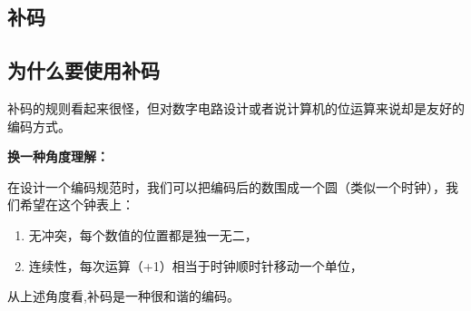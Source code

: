 \subsection{补码}





\subsection{为什么要使用补码}

补码的规则看起来很怪，但对数字电路设计或者说计算机的位运算来说却是友好的编码方式。

\textbf{换一种角度理解：}

在设计一个编码规范时，我们可以把编码后的数围成一个圆（类似一个时钟），我们希望在这个钟表上：
\begin{enumerate}
\item 
无冲突，每个数值的位置都是独一无二，
\item 
连续性，每次运算（+1）相当于时钟顺时针移动一个单位，
\end{enumerate}

从上述角度看,补码是一种很和谐的编码。







